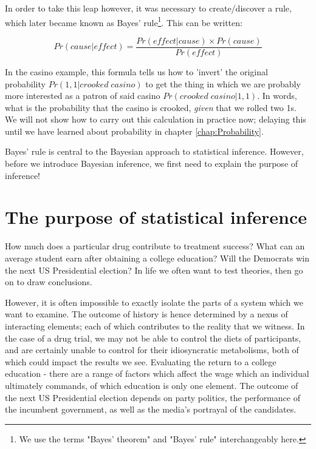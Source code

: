 \documentclass[11pt,fullpage]{book}
\begin{document}
In order to take this leap however, it was necessary to create/discover a rule, which later became known as Bayes' rule\footnote{We use the terms "Bayes' theorem" and "Bayes' rule" interchangeably here.}. This can be written:

\begin{equation}\label{eq:Intro_BayesRuleCauseEffect}
Pr(cause|effect) = \frac{Pr(effect|cause)\times Pr(cause)}{Pr(effect)}
\end{equation}

In the casino example, this formula tells us how to 'invert' the original probability $Pr(1,1|crooked\;casino)$ to get the thing in which we are probably more interested as a patron of said casino $Pr(crooked\;casino|1,1)$. In words, what is the probability that the casino is crooked, \textit{given} that we rolled two 1s. We will not show how to carry out this calculation in practice now; delaying this until we have learned about probability in chapter \ref{chap:Probability}.

Bayes' rule is central to the Bayesian approach to statistical inference. However, before we introduce Bayesian inference, we first need to explain the purpose of inference!

\section{The purpose of statistical inference}\label{sec:Intro_purposeStatisticalInference}
How much does a particular drug contribute to treatment success? What can an average student earn after obtaining a college education? Will the Democrats win the next US Presidential election? In life we often want to test theories, then go on to draw conclusions.

However, it is often impossible to exactly isolate the parts of a system which we want to examine. The outcome of history is hence determined by a nexus of interacting elements; each of which contributes to the reality that we witness. In the case of a drug trial, we may not be able to control the diets of participants, and are certainly unable to control for their idiosyncratic metabolisms, both of which could impact the results we see. Evaluating the return to a college education - there are a range of factors which affect the wage which an individual ultimately commands, of which education is only one element. The outcome of the next US Presidential election depends on party politics, the performance of the incumbent government, as well as the media's portrayal of the candidates. 
\end{document}
